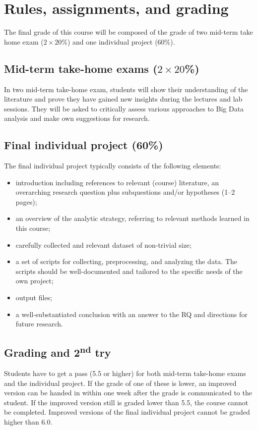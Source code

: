 \documentclass[a4paper,10pt]{report}
\begin{document}
\chapter{Rules, assignments, and grading}
The final grade of this course will be composed of the grade of two mid-term take home exam ($2 \times 20$\%) and one individual project (60\%).

\section{Mid-term take-home exams ($2 \times 20$\%)}
In two mid-term take-home exam, students will show their understanding of the literature and prove they have gained new insights during the lectures and lab sessions. They will be asked to critically assess various approaches to Big Data analysis and make own suggestions for research.

\section{Final individual project (60\%)}
The final individual project typically consists of the following elements:
\begin{itemize}
\item introduction including references to relevant (course) literature, an overarching research question plus subquestions and/or hypotheses (1–2 pages);
\item an overview of the analytic strategy, referring to relevant methods learned in this course;
\item carefully collected and relevant dataset of non-trivial size;
\item a set of scripts for collecting, preprocessing, and analyzing the data. The scripts should be well-documented and tailored to the specific needs of the own project;
\item output files;
\item a well-substantiated conclusion with an answer to the RQ and directions for future research.
\end{itemize}

\section{Grading and 2\textsuperscript{nd} try}
Students have to get a pass (5.5 or higher) for both mid-term take-home exams and the individual project. If the grade of one of these is lower, an improved version can be handed in within one week after the grade is communicated to the student. If the improved version still is graded lower than 5.5, the course cannot be completed. Improved versions of the final individual project cannot be graded higher than 6.0. 
\end{document}
